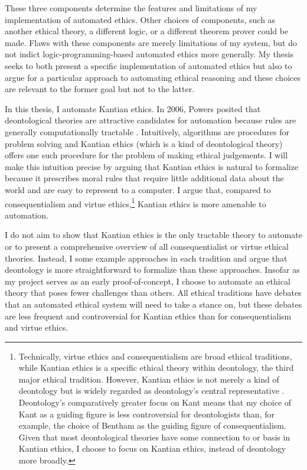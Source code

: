\begin{isabellebody}
\begin{isamarkuptext}
These three components determine the features
and limitations of my implementation of automated ethics. Other choices of 
components, such as another ethical theory, a different logic, or a different theorem prover could be 
made. Flaws with these components are merely limitations of my system, but do not 
indict logic-programming-based automated ethics more generally. My thesis seeks to 
both present a specific implementation of automated ethics but also to argue for a particular approach 
to automating ethical reasoning and these choices are relevant to the former goal but not to the latter.%
\end{isamarkuptext}\isamarkuptrue%
%
\isadelimdocument
%
\endisadelimdocument
%
\isatagdocument
%
\isamarkuptrue%
%
\endisatagdocument
{\isafolddocument}%
%
\isadelimdocument
%
\endisadelimdocument
%
\begin{isamarkuptext}%
In this thesis, I automate Kantian ethics. In 2006, Powers posited that deontological theories are 
attractive candidates for automation because rules are generally computationally tractable \cite[1]{powers}. 
Intuitively, algorithms are procedures for problem solving and Kantian ethics (which is a kind 
of deontological theory) offers one such 
procedure for the problem of making ethical judgements. I will make this intuition precise by
arguing that Kantian ethics is natural to formalize because it prescribes moral rules that require 
little additional data about the world and are easy to represent to a computer. I argue that, compared to 
consequentialism and virtue ethics,\footnote{Technically, virtue ethics and
consequentialism are broad ethical traditions, while Kantian ethics is a specific ethical theory within
deontology, the third major ethical tradition. However, Kantian ethics is not merely a kind of deontology
but is widely regarded as deontology's central representative \citep{sepdeont}. Deontology's comparatively 
greater focus on Kant means that my choice of Kant as a guiding figure is less controversial for deontologists 
than, for example, the choice of Bentham as the guiding figure of consequentialism. Given that most deontological
theories have some connection to or basis in Kantian ethics, I choose to focus on Kantian ethics, instead
of deontology more broadly. } Kantian ethics is more amenable to automation.

I do not aim to show that Kantian ethics is the only tractable theory to automate or
to present a comprehensive overview of all consequentialist or virtue ethical theories. Instead, I 
some example approaches in each tradition and argue that deontology is more straightforward 
to formalize than these approaches. Insofar as my project serves 
as an early proof-of-concept, I choose to automate an ethical theory that 
poses fewer challenges than others. All ethical traditions have debates that an 
automated ethical system will need to take a stance on, but these debates are less frequent and controversial
for Kantian ethics than for consequentialism and virtue ethics.


\end{isamarkuptext}
\end{isabellebody}
